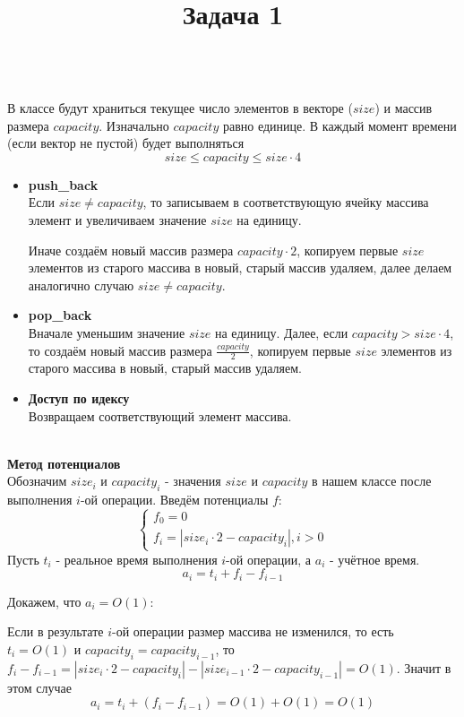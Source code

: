 \documentclass{article}
\title{Задача 1}
\date{}
\newcommand{\ci}[1][i]{capacity_{#1}}
\newcommand{\cpi}{\ci[i-1]}
\newcommand{\si}[1][i]{size_{#1}}
\newcommand{\spi}{\si[i-1]}
\begin{document}
\maketitle
\Large

{\\}
В классе будут храниться текущее число элементов в векторе ($size$) и массив размера $capacity$. Изначально $capacity$ равно единице. В каждый момент времени (если вектор не пустой) будет выполняться
$$size \leqslant capacity \leqslant size\cdot4$$

\begin{itemize}
\item \textbf{push\_back}\\
	Если $size\neq capacity$, то записываем в соответствующую ячейку массива элемент и увеличиваем значение $size$ на единицу.
	
	Иначе создаём новый массив размера ${capacity\cdot2}$, копируем первые $size$ элементов из старого массива в новый, старый массив удаляем, далее делаем аналогично случаю ${size \neq capacity}$.
\item \textbf{pop\_back}\\
	Вначале уменьшим значение $size$ на единицу. Далее, если $capacity > size\cdot4$, то создаём новый массив размера ${\frac{capacity}{2}}$, копируем первые $size$ элементов из старого массива в новый, старый массив удаляем.
\item \textbf{Доступ по идексу}\\
	Возвращаем соответствующий элемент массива.
\end{itemize}
		
\newpage
{\\}
\textbf{Метод потенциалов}\\
	Обозначим $\si$ и $\ci$ - значения $size$ и $capacity$ в нашем классе после выполнения $i$-ой операции. Введём потенциалы $f$: 
	$$\begin{cases}
		f_0=0\\
		f_i=|\si\cdot2-\ci|, i>0
	\end{cases}$$
	Пусть $t_i$ - реальное время выполнения $i$-ой операции, а $a_i$ - учётное время. 
	$$a_i = t_i+f_i-f_{i-1}$$
	
	Докажем, что $a_i=O(1)$:
	
	Если в результате $i$-ой операции размер массива не изменился, то есть $t_i=O(1)$ и $\ci=\cpi$, то
	$f_i-f_{i-1}=|\si\cdot2-\ci|-|\spi\cdot2-\cpi|=O(1)$.
	Значит в этом случае $$a_i=t_i+(f_i-f_{i-1})=O(1)+O(1)=O(1)$$
	
\end{document}
